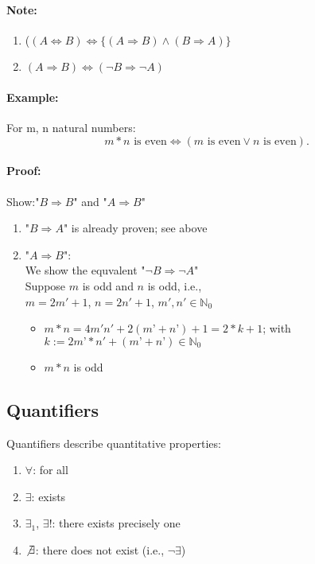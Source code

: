 \documentclass[twocolumn]{article}
\begin{document}
			\paragraph{Note:}
				\begin{enumerate}
				\item ($(A\Leftrightarrow B)
					\Leftrightarrow
					\{(A\Rightarrow B)\wedge(B\Rightarrow A)\}$
				\item $(A\Rightarrow B)\Leftrightarrow(\neg B\Rightarrow\neg A)$ 
				\end{enumerate}
			\paragraph{Example:}
				For m, n natural numbers:
				\[
				m*n\mbox{ is even}\Leftrightarrow(\mbox{$m$ is even}\vee n\mbox{ is even})
				.\] 
			\paragraph{Proof:}
				Show:"$B\Rightarrow B$" and "$A\Rightarrow B$"
				\begin{enumerate}
				\item "$B\Rightarrow A$" is already proven; see above
				\item "$A\Rightarrow B$":\\
			 		We show the equvalent "$\neg B\Rightarrow\neg A$"\\
					Suppose $m$ is odd and $n$ is odd, i.e.,\\
					$m=2m'+1$, $n=2n'+1$, $m',n'\in\mathbb N_0$   
					\begin{itemize}%
					\renewcommand{\labelitemi}{$\Rightarrow$}
					\item $m*n=4m'n'+2(m’+n’)+1=2*k+1$; with $k:=2m’*n'+(m’+n’)\in\mathbb N_0$
				\item $m*n$ is odd 
					\end{itemize}
				\end{enumerate}

	\subsection{Quantifiers}
		Quantifiers describe quantitative properties:
		\begin{enumerate}
		\item $\forall$: for all
		\item $\exists$: exists
		\item $\exists_1$, $\exists!$: there exists precisely one
		\item $\not\exists$: there does not exist (i.e., $\neg\exists$)
		\end{enumerate}
\end{document}
